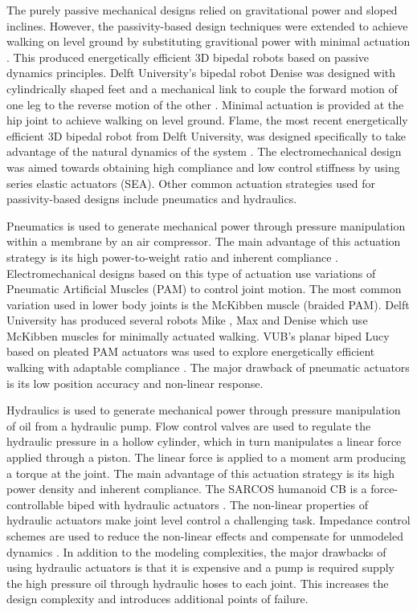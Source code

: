 The purely passive mechanical designs relied on gravitational power and sloped inclines. However, the passivity-based design techniques were extended to achieve walking on level ground by substituting gravitional power with minimal actuation \cite{Collins:2005vp}. This produced energetically efficient 3D bipedal robots based on passive dynamics principles. Delft University's bipedal robot Denise was designed with cylindrically shaped feet and a mechanical link to couple the forward motion of one leg to the reverse motion of the other \cite{Anderson:2005cw}. Minimal actuation is provided at the hip joint to achieve walking on level ground. Flame, the most recent energetically efficient 3D bipedal robot from Delft University, was designed specifically to take advantage of the natural dynamics of the system \cite{Hobbelen2008}. The electromechanical design was aimed towards obtaining high compliance and low control stiffness by using series elastic actuators (SEA). Other common actuation strategies used for passivity-based designs include pneumatics and hydraulics. 


Pneumatics is used to generate mechanical power through pressure manipulation within a membrane by an air compressor. The main advantage of this actuation strategy is its high power-to-weight ratio and inherent compliance \cite{Wisse2007}. Electromechanical designs based on this type of actuation use variations of Pneumatic Artificial Muscles (PAM) to control joint motion. The most common variation used in lower body joints is the McKibben muscle (braided PAM). Delft University has produced several robots Mike \cite{Wisse2003}, Max \cite{Hobbelen2005} and Denise \cite{Hobbelen2008,Wisse:2007wh} which use McKibben muscles for minimally actuated walking. VUB's planar biped Lucy based on pleated PAM actuators was used to explore energetically efficient walking with adaptable compliance \cite{Vanderborght:2005kq}. The major drawback of pneumatic actuators is its low position accuracy and non-linear response. 

Hydraulics is used to generate mechanical power through pressure manipulation of oil from a hydraulic pump. Flow control valves are used to regulate the hydraulic pressure in a hollow cylinder, which in turn manipulates a linear force applied through a piston. The linear force is applied to a moment arm producing a torque at the joint. The main advantage of this actuation strategy is its high power density and inherent compliance. The SARCOS humanoid CB is a force-controllable biped with hydraulic actuators \cite{SangHoHyon:2007jy}. The non-linear properties of hydraulic actuators make joint level control a challenging task. Impedance control schemes are used to reduce the non-linear effects and compensate for unmodeled dynamics \cite{Bilodeau1998}. In addition to the modeling complexities, the major drawbacks of using hydraulic actuators is that it is expensive and a pump is required supply the high pressure oil through hydraulic hoses to each joint. This increases the design complexity and introduces additional points of failure.

